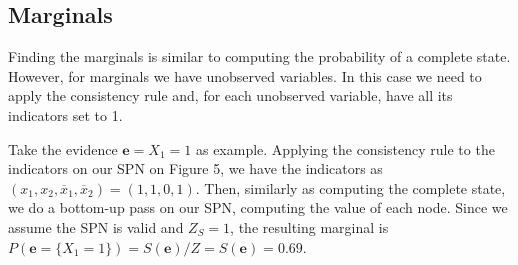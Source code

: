 \documentclass[a4paper,10pt]{article}
\theoremstyle{plain}
\begin{document}
\begin{figure}[h]
\end{figure}

\subsection{Marginals}

Finding the marginals is similar to computing the probability of a complete state. However, for
marginals we have unobserved variables. In this case we need to apply the consistency rule and, for
each unobserved variable, have all its indicators set to 1.

Take the evidence $\mathbf{e}={X_1=1}$ as example. Applying the consistency rule to the indicators
on our SPN on Figure 5, we have the indicators as $(x_1,x_2,\overline{x}_1,\overline{x}_2)=
(1,1,0,1)$. Then, similarly as computing the complete state, we do a bottom-up pass on our SPN,
computing the value of each node. Since we assume the SPN is valid and $Z_S=1$, the resulting
marginal is $P(\mathbf{e}=\{X_1=1\})=S(\mathbf{e})/Z=S(\mathbf{e})=0.69$.
\end{document}
